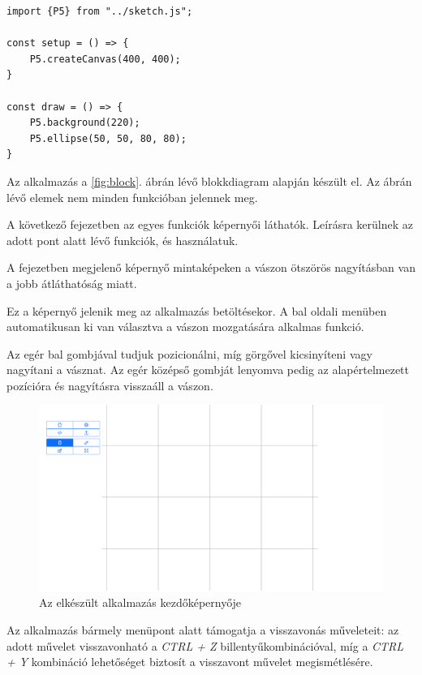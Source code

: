 \begin{lstlisting}[style=es6, morekeywords={P5}]
import {P5} from "../sketch.js";

const setup = () => {
	P5.createCanvas(400, 400);
}

const draw = () => {
	P5.background(220);
	P5.ellipse(50, 50, 80, 80);
}
\end{lstlisting}


Az alkalmazás a \ref{fig:block}. ábrán lévő blokkdiagram alapján készült el. Az ábrán lévő elemek nem minden funkcióban jelennek meg. 

A következő fejezetben az egyes funkciók képernyői láthatók. Leírásra kerülnek az adott pont alatt lévő funkciók, és használatuk.

A fejezetben megjelenő képernyő mintaképeken a vászon ötszörös nagyításban van a jobb átláthatóság miatt.


Ez a képernyő jelenik meg az alkalmazás betöltésekor. A bal oldali menüben automatikusan ki van választva a vászon mozgatására alkalmas funkció.

Az egér bal gombjával tudjuk pozicionálni, míg görgővel kicsinyíteni vagy nagyítani a vásznat. Az egér középső gombját lenyomva pedig az alapértelmezett pozícióra és nagyításra visszaáll a vászon.

\begin{figure}[!h]
	\label{fig:canvas}
	\centering
	\includegraphics[width=\textwidth]{images/editor_canvas.png}
	\caption{Az elkészült alkalmazás kezdőképernyője}
\end{figure}

Az alkalmazás bármely menüpont alatt támogatja a visszavonás műveleteit: az adott művelet visszavonható a \textit{CTRL + Z} billentyűkombinációval, míg a \textit{CTRL + Y} kombináció lehetőséget biztosít a visszavont művelet megismétlésére. 

